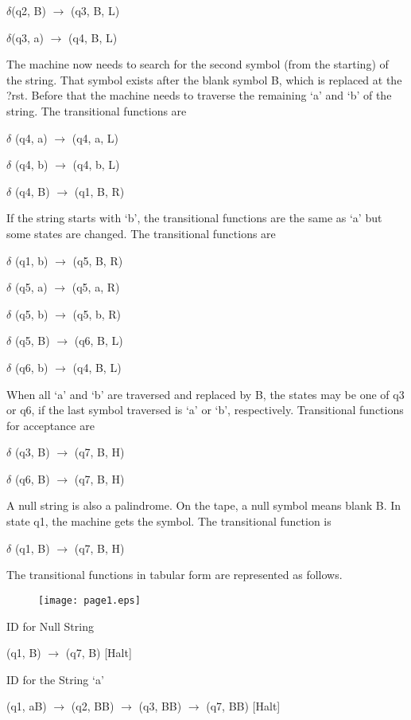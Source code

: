 \documentclass{article}
\begin{document}
$\delta $(q2, B) $\to $ (q3, B, L)

$\delta $(q3, a) $\to $ (q4, B, L)

The machine now needs to search for the second symbol (from the starting) of
the string. That symbol exists after the blank symbol B, which is replaced
at the ?rst. Before that the machine needs to traverse the remaining `a' and
`b' of the string. The transitional functions are

$\delta $ (q4, a) $\to $ (q4, a, L)

$\delta $ (q4, b) $\to $ (q4, b, L)

$\delta $ (q4, B) $\to $ (q1, B, R)

If the string starts with `b', the transitional functions are the same as
`a' but some states are changed. The transitional functions are

$\delta $ (q1, b) $\to $ (q5, B, R)

$\delta $ (q5, a) $\to $ (q5, a, R)

$\delta $ (q5, b) $\to $ (q5, b, R)

$\delta $ (q5, B) $\to $ (q6, B, L)

$\delta $ (q6, b) $\to $ (q4, B, L)

When all `a' and `b' are traversed and replaced by B, the states may be one
of q3 or q6, if the last symbol traversed is `a' or `b', respectively.
Transitional functions for acceptance are

$\delta $ (q3, B) $\to $ (q7, B, H)

$\delta $ (q6, B) $\to $ (q7, B, H)

A null string is also a palindrome. On the tape, a null symbol means blank
B. In state q1, the machine gets the symbol. The transitional function is

$\delta $ (q1, B) $\to $ (q7, B, H)

The transitional functions in tabular form are represented as follows.

\begin{figure}[htbp]
\centerline{\texttt{[image: page1.eps]}}
\label{fig1}
\end{figure}

ID for Null String

\begin{center}
(q1, B) $\to $ (q7, B) [Halt]
\end{center}

ID for the String `a'

\begin{center}
(q1, aB) $\to $ (q2, BB) $\to $ (q3, BB) $\to $ (q7, BB) [Halt]
\end{center}
\end{document}
